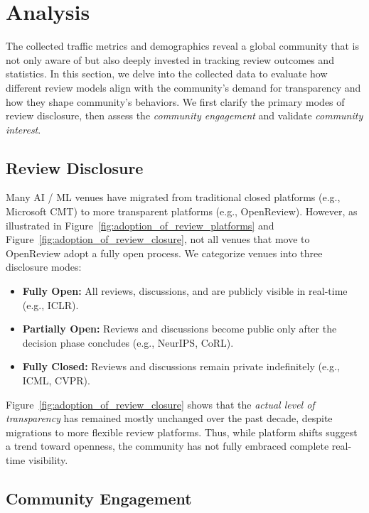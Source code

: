 \section{Analysis}
\label{sec:analysis}

The collected traffic metrics and demographics reveal a global community that is not only aware of but also deeply invested in tracking review outcomes and statistics. In this section, we delve into the collected data to evaluate how different review models align with the community’s demand for transparency and how they shape community's behaviors. We first clarify the primary modes of review disclosure, then assess the \emph{community engagement} and validate \emph{community interest}.


\subsection{Review Disclosure}
\label{subsec:review_disclosure}

Many AI / ML venues have migrated from traditional closed platforms (e.g., Microsoft CMT) to more transparent platforms (e.g., OpenReview). However, as illustrated in Figure~\ref{fig:adoption_of_review_platforms} and Figure~\ref{fig:adoption_of_review_closure}, not all venues that move to OpenReview adopt a fully open process. We categorize venues into three disclosure modes:

\begin{itemize}
    \item \textbf{Fully Open:} All reviews, discussions, and are publicly visible in real-time (e.g., ICLR).
    \item \textbf{Partially Open:} Reviews and discussions become public only after the decision phase concludes (e.g., NeurIPS, CoRL).
    \item \textbf{Fully Closed:} Reviews and discussions remain private indefinitely (e.g., ICML, CVPR).
\end{itemize}

Figure~\ref{fig:adoption_of_review_closure} shows that the \emph{actual level of transparency} has remained mostly unchanged over the past decade, despite migrations to more flexible review platforms. Thus, while platform shifts suggest a trend toward openness, the community has not fully embraced complete real-time visibility.

\subsection{Community Engagement}

